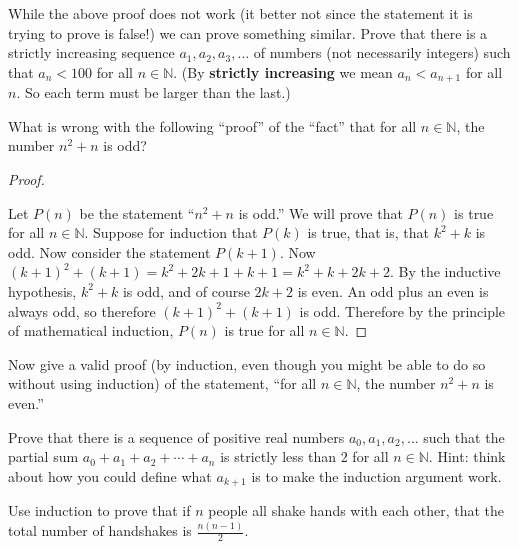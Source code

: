 \documentclass[10pt,]{book}
\newcommand{\terminology}[1]{\textbf{#1}}
\theoremstyle{plain}
\theoremstyle{definition}
\theoremstyle{definition}
\theoremstyle{definition}
\theoremstyle{definition}
\numberwithin{equation}{chapter}
\def\N{\mathbb N}
\newcommand{\lt}{<}
\begin{document}
\begin{divisionexercise}{13}\hypertarget{exercise-268}{}
\hypertarget{p-2199}{}%
While the above proof does not work (it better not since the statement it is trying to prove is false!) we can prove something similar. Prove that there is a strictly increasing sequence \(a_1, a_2, a_3, \ldots\) of numbers (not necessarily integers) such that \(a_n \lt  100\) for all \(n \in \N\). (By \terminology{strictly increasing} we mean \(a_n \lt  a_{n+1}\) for all \(n\). So each term must be larger than the last.)%
\end{divisionexercise}%
\begin{divisionexercise}{14}\hypertarget{exercise-269}{}
\hypertarget{p-2201}{}%
What is wrong with the following ``proof'' of the ``fact'' that for all \(n \in \N\), the number \(n^2 + n\) is odd?%
\begin{proof}\hypertarget{proof-53}{}
\hypertarget{p-2202}{}%
Let \(P(n)\) be the statement ``\(n^2 + n\) is odd.'' We will prove that \(P(n)\) is true for all \(n \in \N\). Suppose for induction that \(P(k)\) is true, that is, that \(k^2 + k\) is odd. Now consider the statement \(P(k+1)\). Now \((k+1)^2 + (k+1) = k^2 + 2k + 1 + k + 1 = k^2 + k + 2k + 2\). By the inductive hypothesis, \(k^2 + k\) is odd, and of course \(2k + 2\) is even. An odd plus an even is always odd, so therefore \((k+1)^2 + (k+1)\) is odd. Therefore by the principle of mathematical induction, \(P(n)\) is true for all \(n \in \N\).%
\end{proof}
\end{divisionexercise}%
\begin{divisionexercise}{15}\hypertarget{exercise-270}{}
\hypertarget{p-2203}{}%
Now give a valid proof (by induction, even though you might be able to do so without using induction) of the statement, ``for all \(n \in \N\), the number \(n^2 + n\) is even.''%
\end{divisionexercise}%
\begin{divisionexercise}{16}\hypertarget{exercise-271}{}
\hypertarget{p-2204}{}%
Prove that there is a sequence of positive real numbers \(a_0, a_1, a_2, \ldots\) such that the partial sum \(a_0 + a_1 + a_2 + \cdots + a_n\) is strictly less than \(2\) for all \(n \in \N\). Hint: think about how you could define what \(a_{k+1}\) is to make the induction argument work.%
\end{divisionexercise}%
\begin{divisionexercise}{17}\hypertarget{exercise-272}{}
\hypertarget{p-2210}{}%
Use induction to prove that if \(n\) people all shake hands with each other, that the total number of handshakes is \(\frac{n(n-1)}{2}\).%
\end{divisionexercise}%
\end{document}
